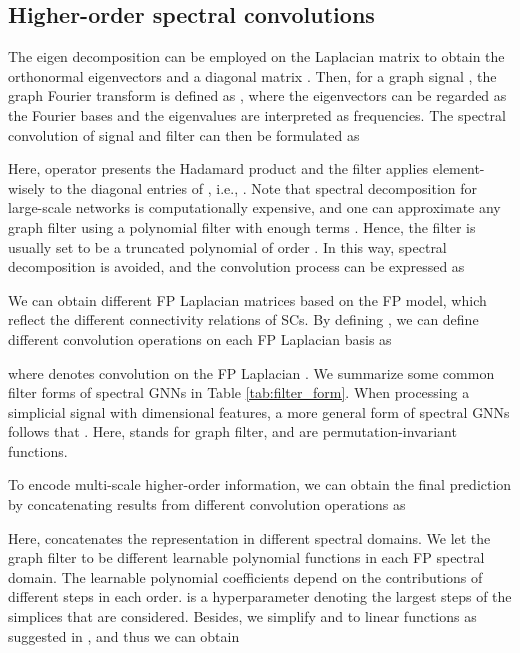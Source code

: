 \documentclass[letterpaper]{article} \usepackage{aaai24}
\theoremstyle{plain}
\theoremstyle{definition}
\theoremstyle{remark}
\begin{document}
\subsection{Higher-order spectral convolutions}

The eigen decomposition  can be employed on the Laplacian matrix to obtain the orthonormal eigenvectors  and a diagonal matrix . 
Then, for a graph signal , the graph Fourier transform is defined as  \cite{graphFourier2013}, where the eigenvectors can be regarded as the Fourier bases and the eigenvalues are interpreted as frequencies. The spectral convolution of signal  and filter  can then be formulated as

Here, operator  presents the Hadamard product and the filter  applies  element-wisely to the diagonal entries of , i.e.,  .
Note that spectral decomposition for large-scale networks is computationally expensive,  and one can approximate any graph filter using a polynomial filter with enough terms \cite{graphFourier2013, BernNet}. 
Hence, the filter  is usually set to be a truncated polynomial   of order .
In this way, spectral decomposition is avoided, and the convolution process can be expressed as



We can obtain different FP Laplacian matrices based on the FP model, which reflect the different connectivity relations of SCs. 
By defining , we can define different convolution operations on each FP Laplacian basis as

where  denotes convolution on the FP Laplacian .
We summarize some common filter forms of spectral GNNs in Table \ref{tab:filter_form}.
When processing a simplicial signal  with  dimensional features, a more general form of spectral GNNs follows that 
.
Here,  stands for graph filter, and  are permutation-invariant functions. 


 
To encode multi-scale higher-order information, we can obtain the final prediction
by concatenating results from different convolution operations as

Here,  concatenates the representation in different spectral domains. 
We let the graph filter  to be different learnable polynomial functions in each FP spectral domain. 
The learnable polynomial coefficients  depend on the contributions of different steps in each order. 
 is a hyperparameter denoting the largest steps of the simplices that are considered. 
Besides, we simplify  and  to linear functions as suggested in \cite{LinearGNN}, and thus we can obtain
\end{document}

